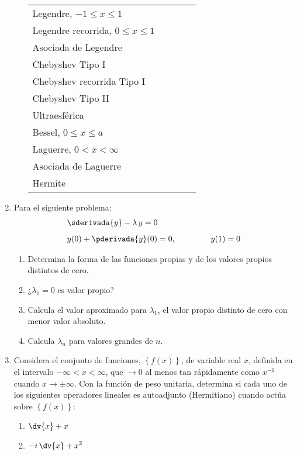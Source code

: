 \begin{enumerate}
\begin{enumerate}[label=\roman*)]
\begin{table}[H]
\begin{tabular}{l p{3cm} p{2cm} p{1.5cm} p{1.5cm}}
Legendre, $-1 \leq x \leq 1$ & & & & \\
Legendre recorrida, $0 \leq x \leq 1$ & & & & \\
Asociada de Legendre & & & & \\
Chebyshev Tipo I & & & & \\
Chebyshev recorrida Tipo I & & & & \\
Chebyshev Tipo II & & & & \\
Ultraesférica & & & & \\
Bessel, $0 \leq x \leq a$ & & & & \\
Laguerre, $0 < x < \infty$ & & & & \\
Asociada de Laguerre & & & & \\
Hermite & & & & \\
\end{tabular}
\end{table}
\end{enumerate}
\item Para el siguiente problema:
\begin{align*}
&\sderivada{y} - \lambda \, y = 0 \\[0.5em]
&y(0) + \pderivada{y}(0) = 0, \hspace{1.5cm} y(1) = 0
\end{align*}
\begin{enumerate}[label=\alph*)]
\item Determina la forma de las funciones propias y de los valores propios distintos de cero.
\item ¿$\lambda_{1} = 0$ es valor propio?
\item Calcula el valor aproximado para $\lambda_{1}$, el valor propio distinto de cero con menor valor absoluto.
\item Calcula $\lambda_{n}$ para valores grandes de $n$.
\end{enumerate}
\item Considera el conjunto de funciones, $\left\{ f (x) \right\}$, de variable real $x$, definida en el intervalo $-\infty < x < \infty$, que $\to 0$ al menos tan rápidamente como $x^{-1}$ cuando $x \to \pm \infty$. Con la función de peso unitaria, determina si cada uno de los siguientes operadores lineales es autoadjunto (Hermitiano) cuando actúa sobre $\left\{ f (x) \right\}$:
\begin{multicols}{2}
\begin{enumerate}[label=\alph*)]
\item $\displaystyle \dv{x} + x$
\item $\displaystyle - i \, \dv{x} + x^{2}$

\end{enumerate}
\end{multicols}
\end{enumerate}
